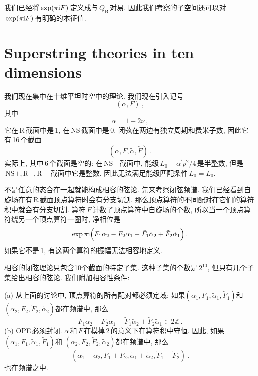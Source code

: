 我们已经将$\,\exp(\pi\mathrm{i} F)\,$定义成与$\,Q_{\text{B}}\,$对易. 因此我们考察的子空间还可以对$\,\exp(\pi\mathrm{i} F)\,$有明确的本征值.

\section{Superstring theories in ten dimensions}

我们现在集中在十维平坦时空中的理论. 我们现在引入记号
\begin{equation}
    (\alpha, F) \:, \label{10.6.1}
\end{equation}
其中
\begin{equation}
    \alpha = 1 - 2\nu \:, \label{10.6.2}
\end{equation}
它在\,R\,截面中是\,1, 在\,NS\,截面中是\,0. 闭弦在两边有独立周期和费米子数, 因此它有\,16\,个截面
\begin{equation}
    (\alpha, F,\tilde{\alpha},\tilde{F})\:. \label{10.6.3}
\end{equation}
实际上, 其中\,6\,个截面是空的: 在\,NS$-$\,截面中, 能级$\,L_{0}-\alpha^{\prime}p^{2}/4\,$是半整数, 但是$\,\text{NS}+,\text{R}+,\text{R}-$截面中它是整数. 因此无法满足能级匹配条件$\,L_{0}=\tilde{L}_{0}$.

不是任意的态合在一起就能构成相容的弦论. 先来考察闭弦频谱. 我们已经看到自旋场在有\,R\,截面顶点算符时会有分支切割. 那么顶点算符的不同配对在它们的算符积中就会有分支切割. 算符$\,F\,$计数了顶点算符中自旋场的个数, 所以当一个顶点算符绕另一个顶点算符一圈时, 净相位是
\begin{equation}
    \exp \pi\mathrm{i}\Bigl(F_{1}\alpha_{2} - F_{2}\alpha_{1} - \tilde{F}_{1}\tilde{\alpha}_{2} +\tilde{F}_{2}\tilde{\alpha}_{1} \Bigr) \:. \label{10.6.4}
\end{equation}
如果它不是\,1, 有这两个算符的振幅无法相容地定义.

相容的闭弦理论只包含10个截面的特定子集. 这种子集的个数是\,$2^{10}$, 但只有几个子集给出相容的弦论. 我们附加相容性条件:

\noindent (a) 从上面的讨论中, 顶点算符的所有配对都必须定域: 如果$(\alpha_{1},F_{1},\tilde{\alpha}_{1},\tilde{F}_{1})$和
$(\alpha_{2},F_{2},\tilde{F}_{2},\tilde{\alpha}_{2})$都在频谱中, 那么
\begin{equation}
    F_{1}\alpha_{2} - F_{2}\alpha_{1} -\tilde{F}_{1}\tilde{\alpha}_{2} +\tilde{F}_{2}\tilde{\alpha}_{1}\in 2\mathds{Z}\:.\label{10.6.5}
\end{equation}
\noindent (b) OPE\,必须封闭. $\alpha\,$和$\,F\,$在模掉\,2\,的意义下在算符积中守恒. 因此, 如果$(\alpha_{1},F_{1},\tilde{\alpha}_{1},\tilde{F}_{1})$和
$(\alpha_{2},F_{2},\tilde{F}_{2},\tilde{\alpha}_{2})$都在频谱中, 那么
\begin{equation}
    (\alpha_{1}+\alpha_{2},F_{1}+F_{2},\tilde{\alpha}_{1}+\tilde{\alpha}_{2},\tilde{F}_{1}+\tilde{F}_{2}) \:.\label{10.6.6}
\end{equation}
也在频谱之中.

